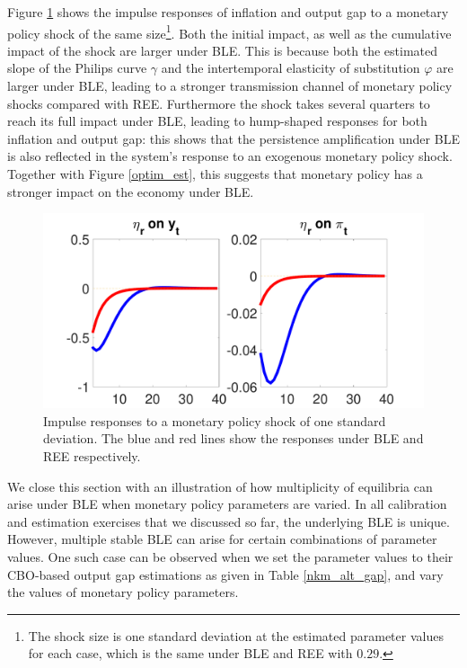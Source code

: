 Figure \ref{imp_resp} shows the impulse responses of inflation and output gap to a monetary policy shock of the same size\footnote{The shock size is one standard deviation at the estimated parameter values for each case, which is the same under BLE and REE with $0.29$.}. Both the initial impact, as well as the cumulative impact of the shock are larger under BLE. This is because both the estimated slope of the Philips curve $\gamma$ and the intertemporal elasticity of substitution $\varphi$ are larger under BLE, leading to a stronger transmission channel of monetary policy shocks compared with REE. Furthermore the shock takes several quarters to reach its full impact under BLE, leading to hump-shaped responses for both inflation and output gap: this shows that the persistence amplification under BLE is also reflected in the system's response to an exogenous monetary policy shock. Together with Figure \ref{optim_est}, this  suggests that monetary policy has a stronger impact on the economy under BLE. 




 
 \begin{figure}
 \centering
\includegraphics[scale=0.25]{nkpc_irfs_comparison.pdf} 
\caption{Impulse responses to a monetary policy shock of one standard deviation. The blue and red lines show the responses under BLE and REE respectively.}
\label{imp_resp}
\end{figure}
             
 We close this section with an illustration of how multiplicity of equilibria can arise under BLE when monetary policy parameters are varied. In all calibration and estimation exercises that we discussed so far, the underlying BLE is unique. However, multiple stable BLE can arise for certain combinations of parameter values. One such case can be observed when we set the parameter values to their CBO-based output gap estimations as given in Table \ref{nkm_alt_gap}, and vary the values of monetary policy parameters. 

